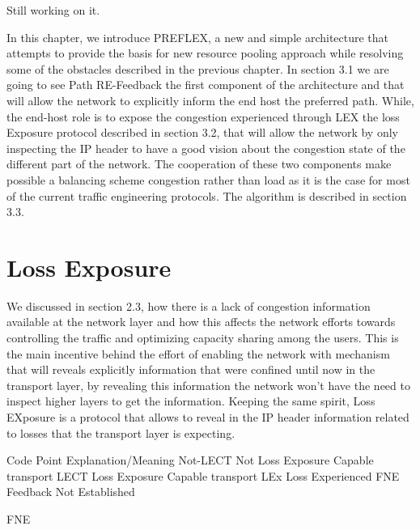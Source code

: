 Still working on it.


In this chapter, we introduce PREFLEX, a new and simple architecture that attempts to provide the basis for new resource pooling approach while resolving some of the obstacles described in the previous chapter. In section 3.1 we are going to see Path RE-Feedback the first component of the architecture and that will allow the network to explicitly inform the end host the preferred path.  While, the end-host role is to expose the congestion experienced through LEX the loss Exposure protocol described in section 3.2, that will allow the network by only inspecting the IP header to have a good vision about the congestion state of the different part of the network. The cooperation of these two components make possible a balancing scheme congestion rather than load as it is the case for most of the current traffic engineering protocols. The algorithm is described in section 3.3.

\section{Loss Exposure}

We discussed in section 2.3, how there is a lack of congestion information available at the network layer and how this affects the network efforts towards controlling the traffic and optimizing capacity sharing among the users. This is the main incentive behind the effort of enabling the network with mechanism that will reveals explicitly information that were confined until now in the transport layer, by revealing this information the network won't have the need to inspect higher layers to get the information. Keeping the same spirit, Loss EXposure is a protocol that allows to reveal in the IP header information related to losses that the transport layer is expecting.


Code Point
Explanation/Meaning
Not-LECT
Not Loss Exposure Capable transport
LECT
Loss Exposure Capable transport
LEx
Loss Experienced
FNE
Feedback Not Established


FNE 

